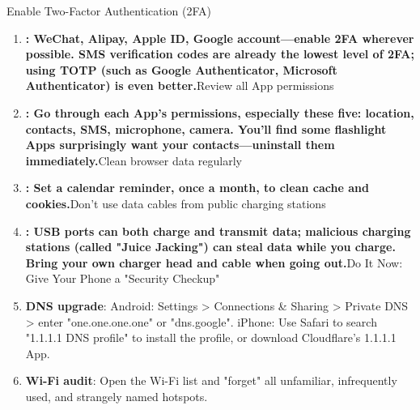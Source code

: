 
Enable Two-Factor Authentication (2FA)

\begin{enumerate}
  \item \textbf{: WeChat, Alipay, Apple ID, Google account—enable 2FA wherever possible. SMS verification codes are already the lowest level of 2FA; using TOTP (such as Google Authenticator, Microsoft Authenticator) is even better.}Review all App permissions
  \item \textbf{: Go through each App's permissions, especially these five: location, contacts, SMS, microphone, camera. You'll find some flashlight Apps surprisingly want your contacts—uninstall them immediately.}Clean browser data regularly
  \item \textbf{: Set a calendar reminder, once a month, to clean cache and cookies.}Don't use data cables from public charging stations
  \item \textbf{: USB ports can both charge and transmit data; malicious charging stations (called "Juice Jacking") can steal data while you charge. Bring your own charger head and cable when going out.}Do It Now: Give Your Phone a "Security Checkup"
  \item \textbf{DNS upgrade}: Android: Settings > Connections \& Sharing > Private DNS > enter "one.one.one.one" or "dns.google". iPhone: Use Safari to search "1.1.1.1 DNS profile" to install the profile, or download Cloudflare's 1.1.1.1 App.
  \item \textbf{Wi-Fi audit}: Open the Wi-Fi list and "forget" all unfamiliar, infrequently used, and strangely named hotspots.
\end{enumerate}

